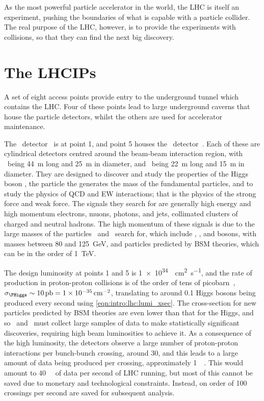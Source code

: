 As the most powerful particle accelerator in the world, the \ac{LHC} is itself 
an experiment, pushing the boundaries of what is capable with a particle 
collider.
The real purpose of the \ac{LHC}, however, is to provide the experiments with 
collisions, so that they can find the next big discovery.

\section{The \aclp{LHCIP}}
\label{chap:intro:lhc:ips}

A set of eight access points provide entry to the underground tunnel which 
contains the \ac{LHC}.
Four of these points lead to large underground caverns that house the particle 
detectors, whilst the others are used for accelerator maintenance.

The \atlas\ detector~\cite{Aad:2008zzm} is at point 1, and point 5 houses the 
\cms\ detector~\cite{Chatrchyan:2008aa}.
Each of these are cylindrical detectors centred around the beam-beam 
interaction region, with \atlas\ being \SI{44}{\metre} long and \SI{25}{\metre} 
in diameter, and \cms\ being \SI{22}{\metre} long and \SI{15}{\metre} in 
diameter.
They are designed to discover and study the properties of the Higgs boson 
\PHiggs, the particle the generates the mass of the fundamental particles, and 
to study the physics of \ac{QCD} and \ac{EW} interactions; that is the physics 
of the strong force and weak force.
The signals they search for are generally high energy and high momentum 
electrons, muons, photons, and jets, collimated clusters of charged and neutral 
hadrons.
The high momentum of these signals is due to the large masses of the particles 
\atlas\ and \cms\ search for, which include \PW, \PZ, and \PHiggs bosons, with 
masses between 80 and \SI{125}{\GeV}, and particles predicted by \ac{BSM} 
theories, which can be in the order of \SI{1}{\TeV}.

The design luminosity at points 1 and 5 is 
\SI{1e34}{\per\square\centi\metre\per\second}, and the rate of \PHiggs 
production in proton-proton collisions is of the order of tens of 
picobarn~\cite{Khachatryan:2016vau}, $\xsec_{\PHiggs} \sim \SI{10}{\pico\barn} 
= \SI{1e-35}{\per\square\centi\metre}$, translating to around 0.1 Higgs bosons 
being produced every second using \cref{eqn:intro:lhc:lumi_xsec}.
The cross-section for new particles predicted by \ac{BSM} theories are even 
lower than that for the Higgs, and so \atlas\ and \cms\ must collect large 
samples of data to make statistically significant discoveries, requiring high 
beam luminosities to achieve it.
As a consequence of the high luminosity, the detectors observe a large number 
of proton-proton interactions per bunch-bunch crossing, around 30, and this 
leads to a large amount of data being produced per crossing, approximately 
\SI{1}{\mega\byte}.
This would amount to \SI{40}{\tera\byte} of data per second of \ac{LHC} 
running, but most of this cannot be saved due to monetary and technological 
constraints.
Instead, on order of 100 crossings per second are saved for subsequent 
analysis.

